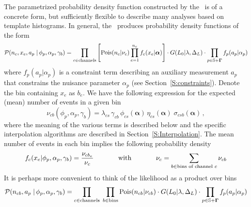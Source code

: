 The parametrized probability density function constructed by the \HF\ is of a concrete form, but sufficiently flexible to describe many analyses based on template histograms.  In general, the \HF\ produces probability density functions of the form
\begin{eqnarray}
\label{eq:likelihood}
{\cal P}(n_c,x_e, a_p \; |\, \phi_p, \alpha_p,\gamma_b )= \prod_{c\in \textrm{channels}} \left[ \textrm{Pois}(n_c|\nu_c)  \prod_{e=1}^{n_c} f_c(x_e | \boldsymbol\alpha)\right ] \cdot G(L_0 | \lambda, \Delta_L) \cdot \prod_{p\in \mathbb{S}+\mathbf{\Gamma}} f_p(a_p|\alpha_p)
\end{eqnarray}
where $f_p(a_p|\alpha_p)$ is a constraint term describing an auxiliary measurement $a_p$ that constrains the  nuisance parameter 
$\alpha_p$ (see Section~\ref{S:constraints}).  Denote the bin containing $x_e$ as $b_e$. We have the following expression for the expected (mean) number of events in a given bin
 \begin{equation}
 \label{eq:muT}
\nu_{cb}(\phi_p,{\alpha_p},\gamma_b)= \lambda_{cs}\,  \gamma_{cb}\, \phi_{cs}( {\boldsymbol \alpha})\,  \eta_{cs}( {\boldsymbol \alpha}) \; \sigma_{csb}( {\boldsymbol \alpha}) \,  ,
 \end{equation}
 where the meaning of the various terms is described below and the specific interpolation algorithms are described in Section~\ref{S:Interpolation}.
  The mean number of events in each bin implies the following probability density
 \begin{equation}
 \label{eq:shape}
   f_c(x_e | \phi_p,{\alpha_p},\gamma_b) = \frac{\nu_{cb_e}}{\nu_c} \hspace{.5in} \textrm{with} \hspace{.5in}\nu_c = \sum_{b \in \textrm{bins~of~channel~} c} \nu_{cb}
\end{equation}
It is perhaps more convenient to think of the likelihood as a product over bins
\begin{eqnarray}
\nonumber
{\cal P}( n_{cb}, a_p \; |\,\phi_p,\alpha_p,\gamma_b)=   \prod_{c\in \textrm{channels}} \; \prod_{b\in \textrm{bins}} \textrm{Pois}(n_{cb}|\nu_{cb}) \cdot G(L_0 | \lambda, \Delta_L) \cdot \prod_{p\in \mathbb{S}+\mathbf{\Gamma}} f_p(a_p|\alpha_p)
\end{eqnarray}

